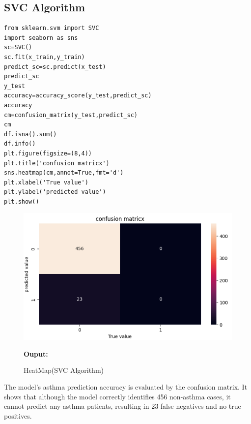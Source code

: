 \subsection{SVC Algorithm}
\begin{verbatim}
from sklearn.svm import SVC
import seaborn as sns
sc=SVC()
sc.fit(x_train,y_train)
predict_sc=sc.predict(x_test)
predict_sc
y_test
accuracy=accuracy_score(y_test,predict_sc)
accuracy
cm=confusion_matrix(y_test,predict_sc)
cm
df.isna().sum()
df.info()
plt.figure(figsize=(8,4))
plt.title('confusion matricx')
sns.heatmap(cm,annot=True,fmt='d')
plt.xlabel('True value')
plt.ylabel('predicted value')
plt.show()
\end{verbatim}
\begin{figure}[h]
\centering
\includegraphics[width=0.7\linewidth]{Images/r4.png}
\caption{HeatMap(SVC Algorithm)}
\label{fig:enter-label}
\textbf{Ouput:}
\end{figure}
The model's asthma prediction accuracy is evaluated by the confusion matrix. It shows that although the model correctly identifies 456 non-asthma cases, it cannot predict any asthma patients, resulting in 23 false negatives and no true positives.

